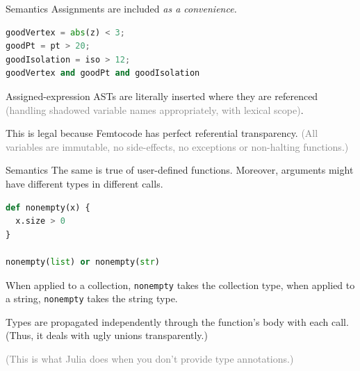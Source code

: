 \documentclass{beamer}
\begin{document}
\begin{frame}[fragile]{Semantics}
\vspace{0.5 cm}
Assignments are included {\it as a convenience.}

\begin{center}
\begin{minipage}{0.9\linewidth}
\small
\begin{lstlisting}[language=python]
goodVertex = abs(z) < 3;
goodPt = pt > 20;
goodIsolation = iso > 12;
goodVertex and goodPt and goodIsolation
\end{lstlisting}
\end{minipage}
\end{center}

Assigned-expression ASTs are literally inserted where they are referenced \textcolor{gray}{(handling shadowed variable names appropriately, with lexical scope)}.

\vspace{0.5 cm}
This is legal because Femtocode has perfect referential transparency. \textcolor{gray}{(All variables are immutable, no side-effects, no exceptions or non-halting functions.)}
\end{frame}

\begin{frame}[fragile]{Semantics}
\vspace{0.5 cm}
The same is true of user-defined functions. Moreover, arguments might have different types in different calls.

\begin{center}
\begin{minipage}{0.9\linewidth}
\small
\begin{lstlisting}[language=python]
def nonempty(x) {
  x.size > 0
}

nonempty(list) or nonempty(str)
\end{lstlisting}
\end{minipage}
\end{center}

When applied to a collection, {\small\tt nonempty} takes the collection type, when applied to a string, {\small\tt nonempty} takes the string type.

\vspace{0.5 cm}
Types are propagated independently through the function's body with each call. (Thus, it deals with ugly unions transparently.)

\vspace{0.5 cm}
\textcolor{gray}{(This is what Julia does when you don't provide type annotations.)}
\end{frame}
\end{document}
